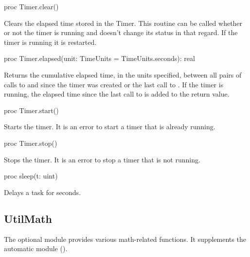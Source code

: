 \begin{protbody}
\begin{protohead}
proc Timer.clear()
\end{protohead}
\begin{protobody}
Clears the elapsed time stored in the Timer.  This routine can be called
whether or not the timer is running and doesn't change its status in that
regard.  If the timer is running it is restarted.
\end{protobody}

\begin{protohead}
proc Timer.elapsed(unit: TimeUnits = TimeUnits.seconds): real
\end{protohead}
\begin{protobody}
Returns the cumulative elapsed time, in the units specified, between
all pairs of calls to  and  since the timer was
created or the last call to .  If the timer is running,
the elapsed time since the last call to  is added to the
return value.
\end{protobody}

\begin{protohead}
proc Timer.start()
\end{protohead}
\begin{protobody}
Starts the timer.  It is an error to start a timer that is already
running.
\end{protobody}

\begin{protohead}
proc Timer.stop()
\end{protohead}
\begin{protobody}
Stops the timer.  It is an error to stop a timer that is not running.
\end{protobody}

\begin{protohead}
proc sleep(t: uint)
\end{protohead}
\begin{protobody}
Delays a task for  seconds.
\end{protobody}


\subsection{UtilMath}
\label{StdModules_UtilMath}

The optional module  provides various math-related functions.
It supplements the automatic  module ().


\end{protbody}
